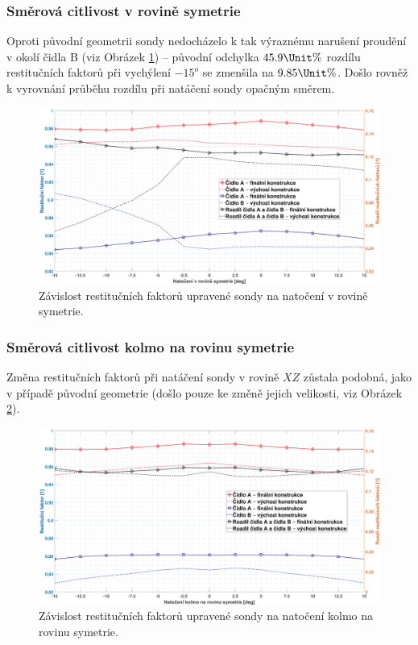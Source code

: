         \subsubsection{Směrová citlivost v rovině symetrie}
            Oproti původní geometrii sondy nedocházelo k tak výraznému narušení proudění v okolí čidla B (viz Obrázek \ref{fig:sonda-final-symetrie}) – původní odchylka $45.9 \Unit{\%}$ rozdílu restitučních faktorů při vychýlení $-15^o$ se zmenšila na $9.85 \Unit{\%}$. Došlo rovněž k vyrovnání průběhu rozdílu při natáčení sondy opačným směrem.
            \begin{figure}[ht!]
                \centering
                \includegraphics*[width=\textwidth]{500_FINAL/final_XY.eps}
                \caption{Závislost restitučních faktorů upravené sondy na natočení v rovině symetrie.}
                \label{fig:sonda-final-symetrie}
            \end{figure}
        \newpage

        \subsubsection{Směrová citlivost kolmo na rovinu symetrie}
            Změna restitučních faktorů při natáčení sondy v rovině $XZ$ zůstala podobná, jako v případě původní geometrie (došlo pouze ke změně jejich velikosti, viz Obrázek \ref{fig:sonda-final-kolma-rovina}).
            \begin{figure}[ht!]
                \centering
                \includegraphics*[width=\textwidth]{500_FINAL/final_XZ.eps}
                \caption{Závislost restitučních faktorů upravené sondy na natočení kolmo na rovinu symetrie.}
                \label{fig:sonda-final-kolma-rovina}
            \end{figure}

